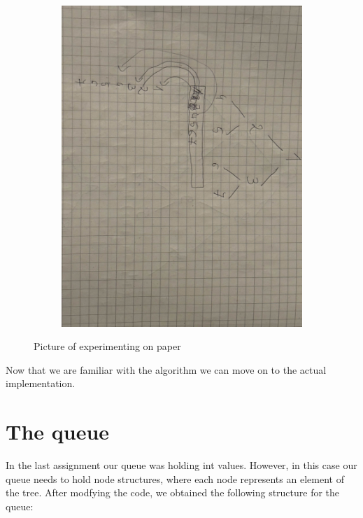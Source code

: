 \documentclass[a4paper,11pt]{article}
\begin{document}
    \begin{figure}[H]
        \centering
        \begin{subfigure}[b]{.5\textwidth}
            \centering
            \includegraphics[width=\textwidth]{./picture.jpg} %
        \end{subfigure}
        \caption{Picture of experimenting on paper}
        \label{fig:graph_1}
    \end{figure}

    Now that we are familiar with the algorithm we can move on to the actual implementation.

    \section*{The queue}

    In the last assignment our queue was holding int values.
    However, in this case our queue needs to hold node structures, where each node represents an element of the tree.
    After modfying the code, we obtained the following structure for the queue:
\end{document}
